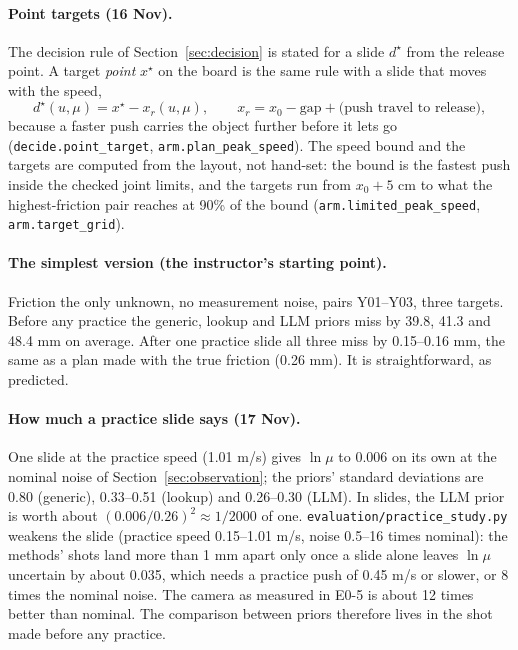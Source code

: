 \documentclass[10pt]{article}
\newcommand{\dstar}{d^{\star}}
\newcommand{\code}[1]{\texttt{#1}}
\begin{document}
\paragraph{Point targets (16 Nov).}  The decision rule of Section~\ref{sec:decision} is stated for a slide $\dstar$ from the
release point.  A target \emph{point} $x^\star$ on the board is the same rule with a slide that moves with the speed,
\begin{equation}
\dstar(u,\mu)=x^\star-x_r(u,\mu),\qquad x_r=x_0-\text{gap}+\text{(push travel to release)},
\end{equation}
because a faster push carries the object further before it lets go (\code{decide.point\_target},
\code{arm.plan\_peak\_speed}).  The speed bound and the targets are computed from the layout, not hand-set: the bound is the
fastest push inside the checked joint limits, and the targets run from $x_0+5$ cm to what the highest-friction pair reaches
at 90\% of the bound (\code{arm.limited\_peak\_speed}, \code{arm.target\_grid}).

\paragraph{The simplest version (the instructor's starting point).}  Friction the only unknown, no measurement noise,
pairs Y01--Y03, three targets.  Before any practice the generic, lookup and LLM priors miss by 39.8, 41.3 and 48.4 mm
on average.  After one practice slide all three miss by 0.15--0.16 mm, the same as a plan made with the true friction
(0.26 mm).  It is straightforward, as predicted.

\paragraph{How much a practice slide says (17 Nov).}  One slide at the practice speed (1.01 m/s) gives $\ln\mu$ to 0.006
on its own at the nominal noise of Section~\ref{sec:observation}; the priors' standard deviations are 0.80 (generic),
0.33--0.51 (lookup) and 0.26--0.30 (LLM).  In slides, the LLM prior is worth about $(0.006/0.26)^2\approx 1/2000$ of
one.  \code{evaluation/practice\_study.py} weakens the slide (practice speed 0.15--1.01 m/s, noise 0.5--16 times
nominal): the methods' shots land more than 1 mm apart only once a slide alone leaves $\ln\mu$ uncertain by about 0.035,
which needs a practice push of 0.45 m/s or slower, or 8 times the nominal noise.  The camera as measured in E0-5 is about
12 times better than nominal.  The comparison between priors therefore lives in the shot made before any practice.
\end{document}

